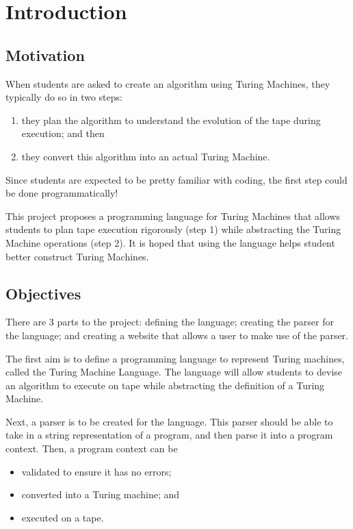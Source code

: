 \chapter{Introduction}


\section{Motivation}
When students are asked to create an algorithm using Turing Machines, they typically do so in two steps:
\begin{enumerate}
    \item they plan the algorithm to understand the evolution of the tape during execution; and then
    \item they convert this algorithm into an actual Turing Machine.
\end{enumerate}
Since students are expected to be pretty familiar with coding, the first step could be done programmatically!

This project proposes a programming language for Turing Machines that allows students to plan tape execution rigorously (step 1) while abstracting the Turing Machine operations (step 2). It is hoped that using the language helps student better construct Turing Machines.

\section{Objectives}
There are 3 parts to the project: defining the language; creating the parser for the language; and creating a website that allows a user to make use of the parser.

The first aim is to define a programming language to represent Turing machines, called the Turing Machine Language. The language will allow students to devise an algorithm to execute on tape while abstracting the definition of a Turing Machine.

Next, a parser is to be created for the language. This parser should be able to take in a string representation of a program, and then parse it into a program context. Then, a program context can be 
\begin{itemize}
    \item validated to ensure it has no errors; 
    \item converted into a Turing machine; and
    \item executed on a tape.
\end{itemize}

